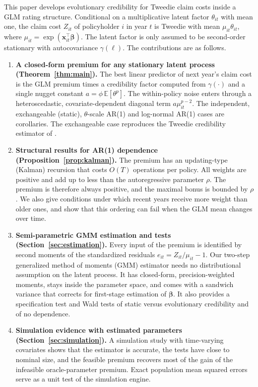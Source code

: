 \documentclass[mathematics,article,submit,moreauthors]{Definitions/mdpi}
\newcommand{\E}{\mathbb{E}}
\newcommand{\bx}{\boldsymbol{x}}
\newcommand{\bbeta}{\boldsymbol{\beta}}
\begin{document}
This paper develops evolutionary credibility for Tweedie claim costs inside a GLM rating structure. Conditional on a multiplicative latent factor $\theta_{it}$ with mean one, the claim cost $Z_{it}$ of policyholder $i$ in year $t$ is Tweedie with mean $\mu_{it}\theta_{it}$, where $\mu_{it}=\exp(\bx_{it}^\top\bbeta)$. The latent factor is only assumed to be second-order stationary with autocovariance $\gamma(\ell)$. The contributions are as follows.
\begin{enumerate}
\item \textbf{A closed-form premium for any stationary latent process (Theorem~\ref{thm:main}).} The best linear predictor of next year's claim cost is the GLM premium times a credibility factor computed from $\gamma(\cdot)$ and a single nugget constant $a=\phi\,\E[\theta^p]$. The within-policy noise enters through a heteroscedastic, covariate-dependent diagonal term $a\mu_{it}^{p-2}$. The independent, exchangeable (static), $\theta$-scale AR(1) and log-normal AR(1) cases are corollaries. The exchangeable case reproduces the Tweedie credibility estimator of \citet{ohlsson2006exact}.
\item \textbf{Structural results for AR(1) dependence (Proposition~\ref{prop:kalman}).} The premium has an updating-type (Kalman) recursion that costs $O(T)$ operations per policy. All weights are positive and add up to less than the autoregressive parameter $\rho$. The premium is therefore always positive, and the maximal bonus is bounded by $\rho$. We also give conditions under which recent years receive more weight than older ones, and show that this ordering can fail when the GLM mean changes over time.
\item \textbf{Semi-parametric GMM estimation and tests (Section~\ref{sec:estimation}).} Every input of the premium is identified by second moments of the standardized residuals $e_{it}=Z_{it}/\mu_{it}-1$. Our two-step generalized method of moments (GMM) estimator needs no distributional assumption on the latent process. It has closed-form, precision-weighted moments, stays inside the parameter space, and comes with a sandwich variance that corrects for first-stage estimation of $\bbeta$. It also provides a \citet{hansen1982} specification test and Wald tests of static versus evolutionary credibility and of no dependence.
\item \textbf{Simulation evidence with estimated parameters (Section~\ref{sec:simulation}).} A simulation study with time-varying covariates shows that the estimator is accurate, the tests have close to nominal size, and the feasible premium recovers most of the gain of the infeasible oracle-parameter premium. Exact population mean squared errors serve as a unit test of the simulation engine.
\end{enumerate}
\end{document}
